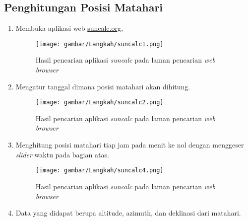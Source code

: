 \subsection{Penghitungan Posisi Matahari}
\begin{enumerate}[leftmargin=*, label=\alph*]
    \item Membuka aplikasi web \href{https://www.suncalc.org/#/-8.0905,112.6468,17/2023.11.10/18:00/1/3}{suncalc.org},
    \begin{figure}[H]
        \centering
        \texttt{[image: gambar/Langkah/suncalc1.png]}
        \caption{Hasil pencarian aplikasi \textit{suncalc} pada laman pencarian \textit{web browser}}
    \end{figure}
    \item Mengatur tanggal dimana posisi matahari akan dihitung.
    \begin{figure}[H]
        \centering
        \texttt{[image: gambar/Langkah/suncalc2.png]}
        \caption{Hasil pencarian aplikasi \textit{suncalc} pada laman pencarian \textit{web browser}}
    \end{figure}
    \item Menghitung posisi matahari tiap jam pada menit ke nol dengan menggeser \textit{slider} waktu pada bagian atas.
    \begin{figure}[H]
        \centering
        \texttt{[image: gambar/Langkah/suncalc4.png]}
        \caption{Hasil pencarian aplikasi \textit{suncalc} pada laman pencarian \textit{web browser}}
    \end{figure}
    \item Data yang didapat berupa altitude, azimuth, dan deklinasi dari matahari.
\end{enumerate}
